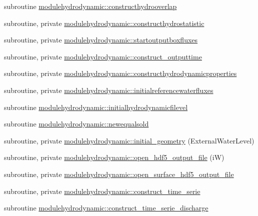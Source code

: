 \begin{DoxyCompactItemize}
\item 
subroutine \mbox{\hyperlink{namespacemodulehydrodynamic_a144fedbdcc486e7eda6dcae5d0b49d78}{modulehydrodynamic\+::constructhydrooverlap}}
\item 
subroutine, private \mbox{\hyperlink{namespacemodulehydrodynamic_a03c47a8a1c14b9e6471a24944ad9aae5}{modulehydrodynamic\+::constructhydrostatistic}}
\item 
subroutine, private \mbox{\hyperlink{namespacemodulehydrodynamic_ae7cd830108d9eacfb53fd458817db13d}{modulehydrodynamic\+::startoutputboxfluxes}}
\item 
subroutine, private \mbox{\hyperlink{namespacemodulehydrodynamic_aea0ceff2b860562b897884814ae392d9}{modulehydrodynamic\+::construct\+\_\+outputtime}}
\item 
subroutine, private \mbox{\hyperlink{namespacemodulehydrodynamic_af871717e205963c29069ba0ee23cd512}{modulehydrodynamic\+::constructhydrodynamicproperties}}
\item 
subroutine, private \mbox{\hyperlink{namespacemodulehydrodynamic_a6cc306a7b1d6e64156d2df83e7ea6550}{modulehydrodynamic\+::initialreferencewaterfluxes}}
\item 
subroutine \mbox{\hyperlink{namespacemodulehydrodynamic_acc95ab35ad823a54bc0cab6a88e60830}{modulehydrodynamic\+::initialhydrodynamicfilevel}}
\item 
subroutine \mbox{\hyperlink{namespacemodulehydrodynamic_a00b05bd1a14d5fd621b3b3ab3463568b}{modulehydrodynamic\+::newequalsold}}
\item 
subroutine, private \mbox{\hyperlink{namespacemodulehydrodynamic_aed12798a19237f32da3dbf20b90a6e41}{modulehydrodynamic\+::initial\+\_\+geometry}} (External\+Water\+Level)
\item 
subroutine, private \mbox{\hyperlink{namespacemodulehydrodynamic_a381b9a6e56cf40fbb60e681f7874c983}{modulehydrodynamic\+::open\+\_\+hdf5\+\_\+output\+\_\+file}} (iW)
\item 
subroutine, private \mbox{\hyperlink{namespacemodulehydrodynamic_a8cd8ea126b12cb779766bcdbe905b6b0}{modulehydrodynamic\+::open\+\_\+surface\+\_\+hdf5\+\_\+output\+\_\+file}}
\item 
subroutine, private \mbox{\hyperlink{namespacemodulehydrodynamic_a50ddc8a159376915f9ee9328f388d4fe}{modulehydrodynamic\+::construct\+\_\+time\+\_\+serie}}
\item 
subroutine \mbox{\hyperlink{namespacemodulehydrodynamic_ae0edf0b5ed199a732c27734b798443ab}{modulehydrodynamic\+::construct\+\_\+time\+\_\+serie\+\_\+discharge}}
\item 

\end{DoxyCompactItemize}
